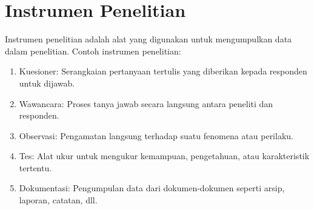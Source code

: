 \documentclass[english,12pt,a4paper]{book}
\begin{document}
\section{Instrumen Penelitian}
Instrumen penelitian adalah alat yang digunakan untuk mengumpulkan data dalam penelitian. Contoh instrumen penelitian:
\begin{enumerate}
	\item Kuesioner: Serangkaian pertanyaan tertulis yang diberikan kepada responden untuk dijawab.
	\item Wawancara: Proses tanya jawab secara langsung antara peneliti dan responden.
	\item Observasi: Pengamatan langsung terhadap suatu fenomena atau perilaku.
	\item Tes: Alat ukur untuk mengukur kemampuan, pengetahuan, atau karakteristik tertentu.
	\item Dokumentasi: Pengumpulan data dari dokumen-dokumen seperti arsip, laporan, catatan, dll.
\end{enumerate}
\end{document}
